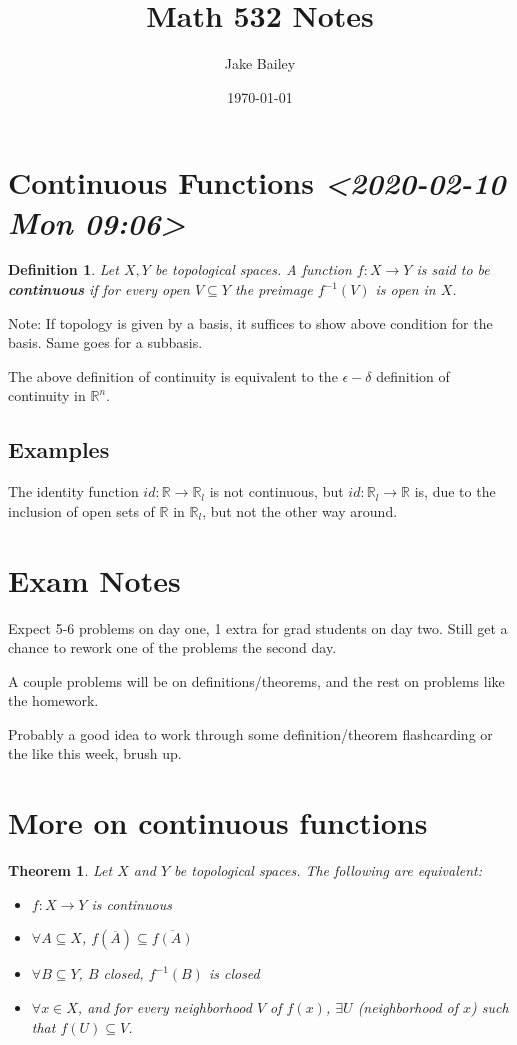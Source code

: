 \documentclass[11pt]{article}
\author{Jake Bailey}
\date{\today}
\title{Math 532 Notes}
\newtheorem{theorem}{Theorem}[section]
\newtheorem{definition}{Definition}[section]
\begin{document}
\maketitle
\tableofcontents


\section{Continuous Functions \textit{<2020-02-10 Mon 09:06>}}
\label{sec:orgaa8de10}
\begin{definition}
Let \(X,Y\) be topological spaces. A function \(f: X\rightarrow Y\) is
said to be \textbf{continuous} if for every open \(V \subseteq Y\) the
preimage \(f^{-1}(V)\) is open in \(X\). 
\end{definition}

Note: If topology is given by a basis, it suffices to show above
condition for the basis. Same goes for a subbasis. 

The above definition of continuity is equivalent to the \(\epsilon -
\delta\) definition of continuity in \(\mathbb{R}^n\).

\subsection{Examples}
\label{sec:org1cf1023}
The identity function \(id: \mathbb{R}\rightarrow\mathbb{R}_l\) is not
continuous, but \(id: \mathbb{R}_l \rightarrow \mathbb{R}\) is, due to
the inclusion of open sets of \(\mathbb{R}\) in \(\mathbb{R}_l\), but not
the other way around. 

\section{Exam Notes}
\label{sec:orgba069a6}
Expect 5-6 problems on day one, 1 extra for grad students on day
two. Still get a chance to rework one of the problems the second day.

A couple problems will be on definitions/theorems, and the rest on
problems like the homework.

Probably a good idea to work through some definition/theorem
flashcarding or the like this week, brush up.

\section{More on continuous functions}
\label{sec:orgb43d574}

\begin{theorem}
Let \(X\) and \(Y\) be topological spaces. The following are equivalent:
\begin{itemize}
\item \(f: X\rightarrow Y\) is continuous
\item \(\forall A \subseteq X\), \(f(\overline{A}) \subseteq \overline{f(A)}\)
\item \(\forall B \subseteq Y\), \(B\) closed, \(f^{-1}(B)\) is closed
\item \(\forall x \in X\), and for every neighborhood \(V\) of \(f(x)\),
\(\exists U\) (neighborhood of \(x\)) such that \(f(U) \subseteq V\).
\end{itemize}
\end{theorem}
\end{document}

